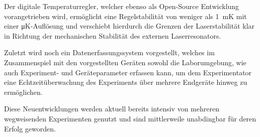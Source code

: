 Der digitale Temperaturregler, welcher ebenso als Open-Source Entwicklung vorangetrieben wird, ermöglicht eine Regelstabilität von weniger als \qty{1}{\milli\kelvin} mit einer \unit{\micro\kelvin}-Auflösung und verschiebt hierdurch die Grenzen der Laserstabilität klar in Richtung der mechanischen Stabilität des externen Laserresonators.

Zuletzt wird noch ein Datenerfassungssystem vorgestellt, welches im Zusammenspiel mit den vorgestellten Geräten sowohl die Laborumgebung, wie auch Experiment- und Geräteparameter erfassen kann, um dem Experimentator eine Echtzeitüberwachung des Experiments über mehrere Endgeräte hinweg zu ermöglichen.

Diese Neuentwicklungen werden aktuell bereits intensiv von mehreren wegweisenden Experimenten genutzt und sind mittlerweile unabdingbar für deren Erfolg geworden.
